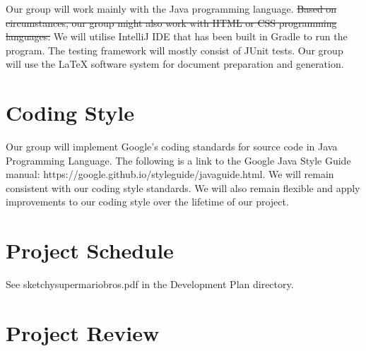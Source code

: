 \documentclass{article}
\begin{document}
Our group will work mainly with the Java programming language. \st{Based on circumstances, our group might also work with HTML or CSS programming languages.} We will utilise IntelliJ IDE that has been built in Gradle to run the program. The testing framework will mostly consist of JUnit tests. Our group will use the LaTeX software system for document preparation and generation.

\section{Coding Style}

Our group will implement Google’s coding standards for source code in Java Programming Language. The following is a link to the Google Java Style Guide manual:  https://google.github.io/styleguide/javaguide.html. We will remain consistent with our coding style standards. We will also remain flexible and apply improvements to our coding style over the lifetime of our project.

\section{Project Schedule}

See sketchysupermariobros.pdf in the Development Plan directory.

\section{Project Review}
\end{document}
